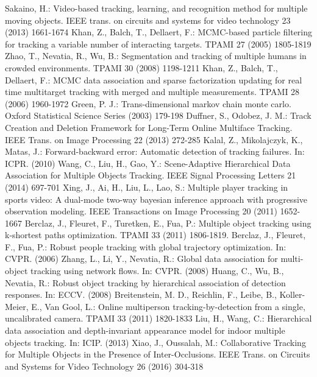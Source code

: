 \documentclass[runningheads]{llncs}
\begin{document}
\begin{thebibliography}{99}
Sakaino, H.: Video-based tracking, learning, and recognition method for multiple moving objects. IEEE trans. on circuits and systems for video technology 23 (2013) 1661-1674
Khan, Z., Balch, T., Dellaert, F.: MCMC-based particle filtering for tracking a variable number of interacting targets. TPAMI 27 (2005) 1805-1819
Zhao, T., Nevatia, R., Wu, B.: Segmentation and tracking of multiple humans in crowded environments. TPAMI 30 (2008) 1198-1211
Khan, Z., Balch, T., Dellaert, F.: MCMC data association and sparse factorization updating for real time multitarget tracking with merged and multiple measurements. TPAMI 28 (2006) 1960-1972
Green, P. J.: Trans-dimensional markov chain monte carlo. Oxford Statistical Science Series (2003) 179-198
Duffner, S., Odobez, J. M.: Track Creation and Deletion Framework for Long-Term Online Multiface Tracking. IEEE Trans. on Image Processing 22 (2013) 272-285
Kalal, Z., Mikolajczyk, K., Matas, J.: Forward-backward error: Automatic detection of tracking failures. In: ICPR. (2010) 
Wang, C., Liu, H., Gao, Y.: Scene-Adaptive Hierarchical Data Association for Multiple Objects Tracking. IEEE Signal Processing Letters 21 (2014) 697-701
Xing, J., Ai, H., Liu, L., Lao, S.: Multiple player tracking in sports video: A dual-mode two-way bayesian inference approach with progressive observation modeling. IEEE Transactions on Image Processing 20 (2011) 1652-1667
Berclaz, J., Fleuret, F., Turetken, E., Fua, P.: Multiple object tracking using k-shortest paths optimization. TPAMI 33 (2011) 1806-1819.
Berclaz, J., Fleuret, F., Fua, P.: Robust people tracking with global trajectory optimization. In: CVPR. (2006)
Zhang, L., Li, Y., Nevatia, R.: Global data association for multi-object tracking using network flows. In: CVPR. (2008)
Huang, C., Wu, B., Nevatia, R.: Robust object tracking by hierarchical association of detection responses. In: ECCV. (2008) 
Breitenstein, M. D., Reichlin, F., Leibe, B., Koller-Meier, E., Van Gool, L.: Online multiperson tracking-by-detection from a single, uncalibrated camera. TPAMI 33 (2011) 1820-1833
Liu, H., Wang, C.: Hierarchical data association and depth-invariant appearance model for indoor multiple objects tracking. In: ICIP. (2013) 
Xiao, J., Oussalah, M.: Collaborative Tracking for Multiple Objects in the Presence of Inter-Occlusions. IEEE Trans. on Circuits and Systems for Video Technology 26 (2016) 304-318

\end{thebibliography}
\end{document}
